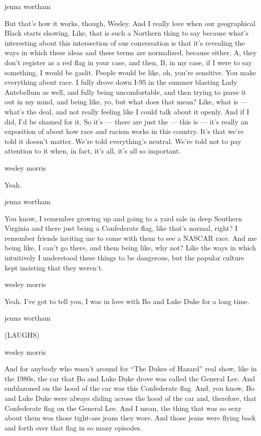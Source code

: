 jenna wortham

But that's how it works, though, Wesley. And I really love when our
geographical Black starts showing. Like, that is such a Northern thing
to say because what's interesting about this intersection of our
conversation is that it's revealing the ways in which these ideas and
these terms are normalized, because either, A, they don't register as a
red flag in your case, and then, B, in my case, if I were to say
something, I would be gaslit. People would be like, oh, you're
sensitive. You make everything about race. I fully drove down I-95 in
the summer blasting Lady Antebellum as well, and fully being
uncomfortable, and then trying to parse it out in my mind, and being
like, yo, but what does that mean? Like, what is --- what's the deal,
and not really feeling like I could talk about it openly. And if I did,
I'd be shamed for it. So it's --- there are just the --- this is ---
it's really an exposition of about how race and racism works in this
country. It's that we're told it doesn't matter. We're told everything's
neutral. We're told not to pay attention to it when, in fact, it's all,
it's all so important.

wesley morris

Yeah.

jenna wortham

You know, I remember growing up and going to a yard sale in deep
Southern Virginia and there just being a Confederate flag, like that's
normal, right? I remember friends inviting me to come with them to see a
NASCAR race. And me being like, I can't go there, and them being like,
why not? Like the ways in which intuitively I understood these things to
be dangerous, but the popular culture kept insisting that they weren't.

wesley morris

Yeah. I've got to tell you, I was in love with Bo and Luke Duke for a
long time.

jenna wortham

(LAUGHS)

wesley morris

And for anybody who wasn't around for ``The Dukes of Hazard'' real show,
like in the 1980s, the car that Bo and Luke Duke drove was called the
General Lee. And emblazoned on the hood of the car was this Confederate
flag. And, you know, Bo and Luke Duke were always sliding across the
hood of the car and, therefore, that Confederate flag on the General
Lee. And I mean, the thing that was so sexy about them was those
tight-ass jeans they wore. And those jeans were flying back and forth
over that flag in so many episodes.

